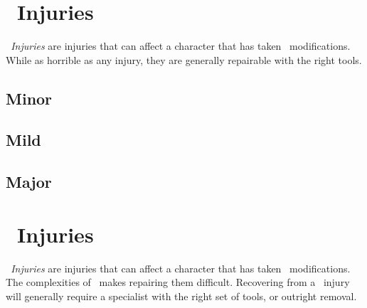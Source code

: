\section{\dieselt\ Injuries}\label{sec:dies_injuries}
\emph{\dieselt\ Injuries} are injuries that can affect a character that has taken \dieselt\ modifications. While as horrible as any injury, they are generally repairable with the right tools.
\subsection{Minor}
\begin{multicols}{2}

\end{multicols}
\subsection{Mild}
\begin{multicols}{2}

\end{multicols}
\subsection{Major}
\begin{multicols}{2}

\end{multicols}

\section{\cybert\ Injuries}\label{sec:cybr_injuries}
\emph{\cybert\ Injuries} are injuries that can affect a character that has taken \cybert\ modifications. The complexities of \cybert\ makes repairing them difficult. Recovering from a \cybert\ injury will generally require a specialist with the right set of tools, or outright removal.

